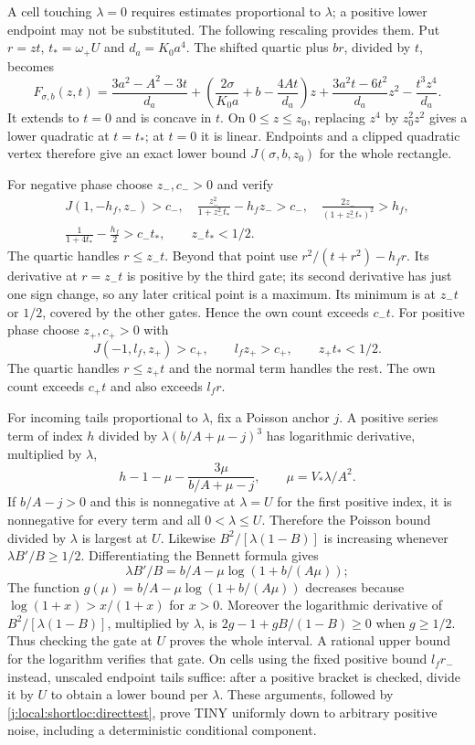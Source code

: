 A cell touching $\lambda=0$ requires estimates proportional to $\lambda$;
a positive lower endpoint may not be substituted. The following rescaling
provides them. Put $r=zt$, $t_*=\omega_+U$ and $d_a=K_0a^4$.
The shifted quartic plus $br$, divided by $t$, becomes
\begin{equation}\label{j:local:shortloc:scaledown}
 F_{\sigma,b}(z,t)=\frac{3a^2-A^2-3t}{d_a}
 +\left(\frac{2\sigma}{K_0a}+b-\frac{4At}{d_a}\right)z
 +\frac{3a^2t-6t^2}{d_a}z^2-\frac{t^3z^4}{d_a}.
\end{equation}
It extends to $t=0$ and is concave in $t$. On $0\le z\le z_0$, replacing
$z^4$ by $z_0^2z^2$ gives a lower quadratic at $t=t_*$; at $t=0$ it is
linear. Endpoints and a clipped quadratic vertex therefore give an exact
lower bound $J(\sigma,b,z_0)$ for the whole rectangle.

For negative phase choose $z_-,c_->0$ and verify
\begin{gather}\label{j:local:shortloc:tinynegative}
 J(1,-h_f,z_-)>c_-,\quad
 \frac{z_-^2}{1+z_-^2t_*}-h_fz_->c_-,\quad
 \frac{2z_-}{(1+z_-^2t_*)^2}>h_f,\\
 \frac1{1+4t_*}-\frac{h_f}{2}>c_-t_*,\qquad z_-t_*<1/2.\nonumber
\end{gather}
The quartic handles $r\le z_-t$. Beyond that point use
$r^2/(t+r^2)-h_fr$. Its derivative at $r=z_-t$ is positive by the third
gate; its second derivative has just one sign change, so any later critical
point is a maximum. Its minimum is at $z_-t$ or $1/2$, covered by the other
gates. Hence the own count exceeds $c_-t$.
For positive phase choose $z_+,c_+>0$ with
\begin{equation}\label{j:local:shortloc:tinypositive}
 J(-1,l_f,z_+)>c_+,\qquad l_fz_+>c_+,\qquad z_+t_*<1/2.
\end{equation}
The quartic handles $r\le z_+t$ and the normal term handles the rest.
The own count exceeds $c_+t$ and also exceeds $l_fr$.

For incoming tails proportional to $\lambda$, fix a Poisson anchor $j$.
A positive series term of index $h$ divided by
$\lambda(b/A+\mu-j)^3$ has logarithmic derivative, multiplied by $\lambda$,
\[
 h-1-\mu-\frac{3\mu}{b/A+\mu-j},\qquad \mu=V_*\lambda/A^2.
\]
If $b/A-j>0$ and this is nonnegative at $\lambda=U$ for the first positive
index, it is nonnegative for every term and all $0<\lambda\le U$.
Therefore the Poisson bound divided by $\lambda$ is largest at $U$.
Likewise $B^2/[\lambda(1-B)]$ is increasing whenever
$\lambda B'/B\ge1/2$. Differentiating the Bennett formula gives
\[
 \lambda B'/B=b/A-\mu\log(1+b/(A\mu));
\]
The function $g(\mu)=b/A-\mu\log(1+b/(A\mu))$ decreases because
$\log(1+x)>x/(1+x)$ for $x>0$. Moreover the logarithmic derivative of
$B^2/[\lambda(1-B)]$, multiplied by $\lambda$, is
$2g-1+gB/(1-B)\ge0$ when $g\ge1/2$. Thus checking the gate at $U$
proves the whole interval. A rational upper bound for the logarithm
verifies that gate. On cells using the fixed positive bound $l_fr_-$ instead,
unscaled endpoint tails suffice: after a positive bracket is checked, divide
it by $U$ to obtain a lower bound per $\lambda$. These arguments, followed by
\eqref{j:local:shortloc:directtest}, prove TINY uniformly down to arbitrary positive
noise, including a deterministic conditional component.

